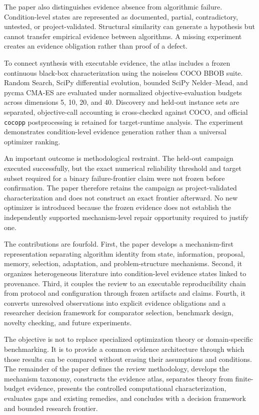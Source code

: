 The paper also distinguishes evidence absence from algorithmic failure. Condition-level states are represented as documented, partial, contradictory, untested, or project-validated. Structural similarity can generate a hypothesis but cannot transfer empirical evidence between algorithms. A missing experiment creates an evidence obligation rather than proof of a defect.

To connect synthesis with executable evidence, the atlas includes a frozen continuous black-box characterization using the noiseless COCO BBOB suite. Random Search, SciPy differential evolution, bounded SciPy Nelder--Mead, and pycma CMA-ES are evaluated under normalized objective-evaluation budgets across dimensions 5, 10, 20, and 40. Discovery and held-out instance sets are separated, objective-call accounting is cross-checked against COCO, and official \texttt{cocopp} postprocessing is retained for target-runtime analysis. The experiment demonstrates condition-level evidence generation rather than a universal optimizer ranking.

An important outcome is methodological restraint. The held-out campaign executed successfully, but the exact numerical reliability threshold and target subset required for a binary failure-frontier claim were not frozen before confirmation. The paper therefore retains the campaign as project-validated characterization and does not construct an exact frontier afterward. No new optimizer is introduced because the frozen evidence does not establish the independently supported mechanism-level repair opportunity required to justify one.

The contributions are fourfold. First, the paper develops a mechanism-first representation separating algorithm identity from state, information, proposal, memory, selection, adaptation, and problem-structure mechanisms. Second, it organizes heterogeneous literature into condition-level evidence states linked to provenance. Third, it couples the review to an executable reproducibility chain from protocol and configuration through frozen artifacts and claims. Fourth, it converts unresolved observations into explicit evidence obligations and a researcher decision framework for comparator selection, benchmark design, novelty checking, and future experiments.

The objective is not to replace specialized optimization theory or domain-specific benchmarking. It is to provide a common evidence architecture through which those results can be compared without erasing their assumptions and conditions. The remainder of the paper defines the review methodology, develops the mechanism taxonomy, constructs the evidence atlas, separates theory from finite-budget evidence, presents the controlled computational characterization, evaluates gaps and existing remedies, and concludes with a decision framework and bounded research frontier.
